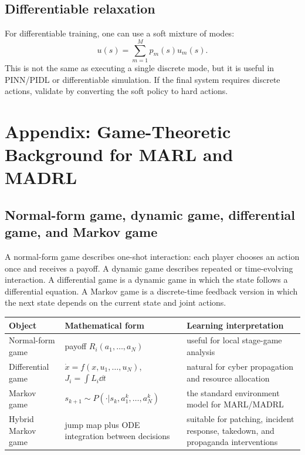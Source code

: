 \documentclass[11pt,a4paper]{article}
\begin{document}
\subsection{Differentiable relaxation}
For differentiable training, one can use a soft mixture of modes:
\begin{equation}
    u(s)=\sum_{m=1}^{M}p_m(s)u_m(s).
\end{equation}
This is not the same as executing a single discrete mode, but it is useful in PINN/PIDL or differentiable simulation. If the final system requires discrete actions, validate by converting the soft policy to hard actions.




\section{Appendix: Game-Theoretic Background for MARL and MADRL}\label{app:game-madrl-background}
\subsection{Normal-form game, dynamic game, differential game, and Markov game}
A normal-form game describes one-shot interaction: each player chooses an action once and receives a payoff. A dynamic game describes repeated or time-evolving interaction. A differential game is a dynamic game in which the state follows a differential equation. A Markov game is a discrete-time feedback version in which the next state depends on the current state and joint actions.

\begin{longtable}{p{}p{}p{}}
\toprule
Object & Mathematical form & Learning interpretation \\
\midrule
Normal-form game & payoff $R_i(a_1,\ldots,a_N)$ & useful for local stage-game analysis \\
Differential game & $\dot{x}=f(x,u_1,\ldots,u_N)$, $J_i=\int L_i\dd t$ & natural for cyber propagation and resource allocation \\
Markov game & $s_{k+1}\sim P(\cdot|s_k,a_1^k,\ldots,a_N^k)$ & the standard environment model for MARL/MADRL \\
Hybrid Markov game & jump map plus ODE integration between decisions & suitable for patching, incident response, takedown, and propaganda interventions \\
\bottomrule
\end{longtable}
\end{document}
